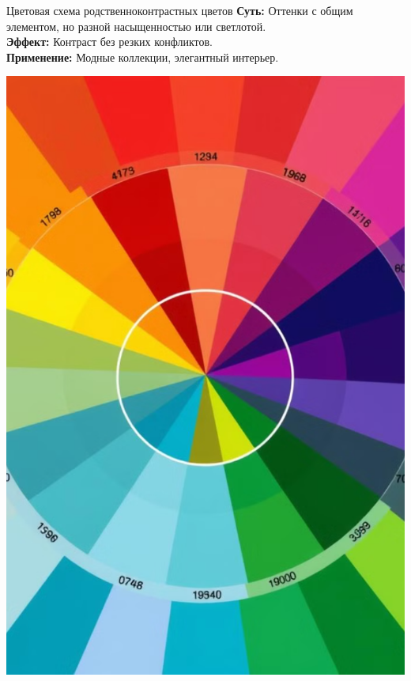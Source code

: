 \documentclass{beamer}
\begin{document}
\begin{frame}{Цветовая схема родственноконтрастных цветов}
    \textbf{Суть:} Оттенки с общим элементом, но разной насыщенностью или светлотой. \\
    \vspace{0.3cm}
    \textbf{Эффект:} Контраст без резких конфликтов. \\
    \vspace{0.3cm}
    \textbf{Применение:} Модные коллекции, элегантный интерьер.
    \begin{center}
        \includegraphics[width=0.6\linewidth]{related_contrast_example.png} %
    \end{center}
\end{frame}
\end{document}
